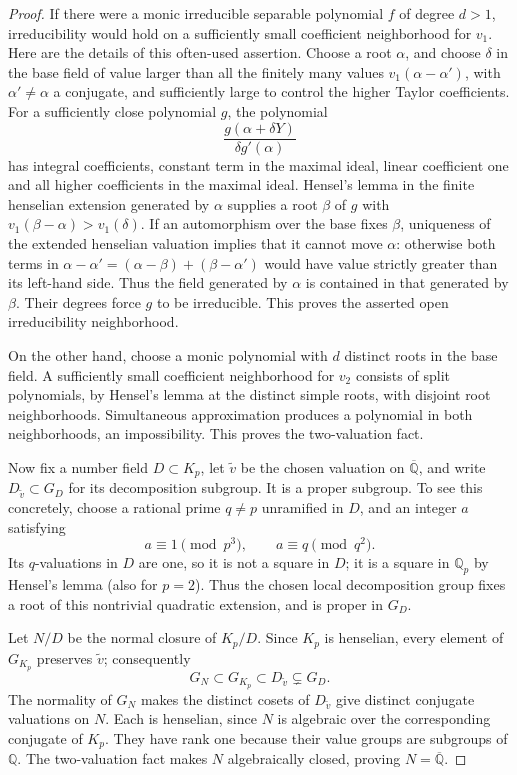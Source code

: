 \documentclass[11pt]{article}
\begin{document}
\begin{proof}
If there were a monic irreducible separable polynomial
\(f\) of degree \(d>1\), irreducibility would hold on
a sufficiently small coefficient neighborhood for \(v_1\).
Here are the details of this often-used assertion. Choose
a root \(\alpha\), and choose \(\delta\) in the base
field of value larger than all the finitely many values
\(v_1(\alpha-\alpha')\), with \(\alpha'\ne\alpha\)
a conjugate, and sufficiently large to control the higher
Taylor coefficients. For a sufficiently close polynomial
\(g\), the polynomial
\[
 \frac{g(\alpha+\delta Y)}{\delta g'(\alpha)}
\]
has integral coefficients, constant term in the maximal
ideal, linear coefficient one and all higher coefficients
in the maximal ideal. Hensel's lemma in the finite
henselian extension generated by \(\alpha\) supplies
a root \(\beta\) of \(g\) with
\(v_1(\beta-\alpha)>v_1(\delta)\).
If an automorphism over the base fixes \(\beta\),
uniqueness of the extended henselian valuation implies
that it cannot move \(\alpha\): otherwise both terms
in \(\alpha-\alpha'=(\alpha-\beta)+(\beta-\alpha')\)
would have value strictly greater than its left-hand side.
Thus the field generated by \(\alpha\) is contained
in that generated by \(\beta\). Their degrees force
\(g\) to be irreducible. This proves the asserted open
irreducibility neighborhood.

On the other hand, choose a monic polynomial with \(d\)
distinct roots in the base field. A sufficiently small
coefficient neighborhood for \(v_2\) consists of split
polynomials, by Hensel's lemma at the distinct simple
roots, with disjoint root neighborhoods. Simultaneous
approximation produces a polynomial in both neighborhoods,
an impossibility. This proves the two-valuation fact.

Now fix a number field \(D\subset K_p\), let
\(\widetilde v\) be the chosen valuation on
\(\overline{\mathbb Q}\), and write
\(D_{\widetilde v}\subset G_D\) for its decomposition
subgroup. It is a proper subgroup. To see this concretely,
choose a rational prime \(q\ne p\) unramified in
\(D\), and an integer \(a\) satisfying
\[
 a\equiv1\pmod{p^3},\qquad a\equiv q\pmod{q^2}.
\]
Its \(q\)-valuations in \(D\) are one, so it is not
a square in \(D\); it is a square in \(\mathbb Q_p\)
by Hensel's lemma (also for \(p=2\)). Thus the chosen
local decomposition group fixes a root of this nontrivial
quadratic extension, and is proper in \(G_D\).

Let \(N/D\) be the normal closure of \(K_p/D\).
Since \(K_p\) is henselian, every element of \(G_{K_p}\)
preserves \(\widetilde v\); consequently
\[
 G_N\subset G_{K_p}\subset D_{\widetilde v}
                       \subsetneq G_D.
\]
The normality of \(G_N\) makes the distinct cosets of
\(D_{\widetilde v}\) give distinct conjugate valuations
on \(N\). Each is henselian, since \(N\) is algebraic
over the corresponding conjugate of \(K_p\). They have
rank one because their value groups are subgroups of
\(\mathbb Q\). The two-valuation fact makes \(N\)
algebraically closed, proving \(N=\overline{\mathbb Q}\).


\end{proof}
\end{document}
